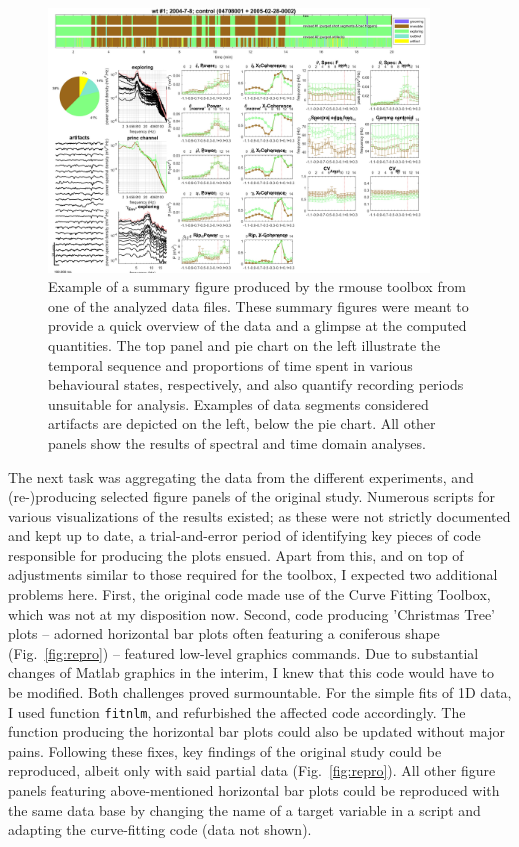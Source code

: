 \begin{figure}
	\centering
	\includegraphics[width=0.9\textwidth]{figures/example_summaryFig_rmouse.jpg}
	\caption{Example of a summary figure produced by the rmouse toolbox from one of the analyzed data files. These summary figures were meant to provide a quick overview of the data and a glimpse at the computed quantities. The top panel and pie chart on the left illustrate the temporal sequence and proportions of time spent in various behavioural states, respectively, and also quantify recording periods unsuitable for analysis. Examples of data segments considered artifacts are depicted on the left, below the pie chart. All other panels show the results of spectral and time domain analyses.}
	\label{fig:rmouse_workingstyle}
\end{figure}

The next task was aggregating the data from the different experiments, and (re-)producing selected figure panels of the original study. Numerous scripts for various visualizations of the results existed; as these were not strictly documented and kept up to date, a trial-and-error period of identifying key pieces of code responsible for producing the plots ensued. Apart from this, and on top of adjustments similar to those required for the toolbox, I expected two additional problems here. First, the original code made use of the Curve Fitting Toolbox, which was not at my disposition now. Second, code producing 'Christmas Tree' plots -- adorned horizontal bar plots often featuring a coniferous shape (Fig.~\ref{fig:repro}) -- featured low-level graphics commands. Due to substantial changes of Matlab graphics in the interim, I knew that this code would have to be modified.
Both challenges proved surmountable. For the simple fits of 1D data, I used function \texttt{fitnlm}, and refurbished the affected code accordingly. The function producing the horizontal bar plots could also be updated without major pains. Following these fixes, key findings of the original study could be reproduced, albeit only with said partial data (Fig.~\ref{fig:repro}). All other figure panels featuring above-mentioned horizontal bar plots could be reproduced with the same data base by  changing the name of a target variable in a script and adapting the curve-fitting code (data not shown).

